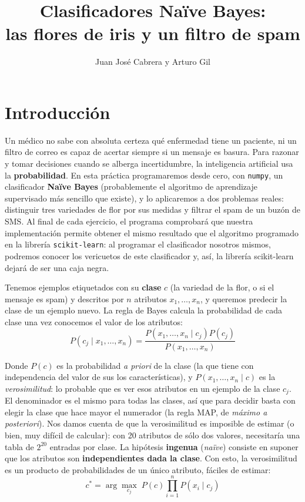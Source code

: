 \documentclass{article}
\title{Clasificadores Naïve Bayes:\\ las flores de iris y un filtro de spam}
\author{Juan José Cabrera y Arturo Gil}
\begin{document}
\maketitle

\section*{Introducción}
Un médico no sabe con absoluta certeza qué enfermedad tiene un paciente, ni un filtro de correo es capaz de acertar siempre si un mensaje es basura. Para razonar y tomar decisiones cuando se alberga incertidumbre, la inteligencia artificial usa la \textbf{probabilidad}. En esta práctica programaremos desde cero, con \texttt{numpy}, un clasificador \textbf{Naïve Bayes} (probablemente el algoritmo de aprendizaje supervisado más sencillo que existe), y lo aplicaremos a dos problemas reales: distinguir tres variedades de flor por sus medidas y filtrar el spam de un buzón de SMS. Al final de cada ejercicio, el programa comprobará que nuestra implementación permite obtener el mismo resultado que el algoritmo programado en la librería \texttt{scikit-learn}: al programar el clasificador  nosotros mismos, podremos conocer los vericuetos de este clasificador y, así, la librería scikit-learn dejará de ser una caja negra.

Tenemos ejemplos etiquetados con su \textbf{clase} $c$ (la variedad de la flor, o si el mensaje es spam) y descritos por $n$ atributos $x_1, \ldots, x_n$, y queremos predecir la clase de un ejemplo nuevo. La regla de Bayes calcula la probabilidad de cada clase una vez conocemos el valor de los atributos:
\begin{equation}
P(c_j \mid x_1, \ldots, x_n) = \frac{P(x_1, \ldots, x_n \mid c_j)P(c_j)}{P(x_1, \ldots, x_n)}
\end{equation}

\noindent Donde $P(c)$ es la probabilidad \textit{a priori} de la clase (la que tiene con independencia del valor de sus los características), y $P(x_1, \ldots, x_n \mid c)$ es la \textit{verosimilitud}: lo probable que es ver esos atributos en un ejemplo de la clase $c_j$. El denominador es el mismo para todas las clases, así que para decidir basta con elegir la clase que hace mayor el numerador (la regla MAP, de \textit{máximo a posteriori}). Nos damos cuenta de que la verosimilitud es imposible de estimar (o bien, muy difícil de calcular): con 20 atributos de sólo dos valores, necesitaría una tabla de $2^{20}$ entradas por clase. La hipótesis \textbf{ingenua} (\textit{naïve}) consiste en suponer que los atributos son \textbf{independientes dada la clase}. Con esto, la verosimilitud es un producto de probabilidades de un único atributo, fáciles de estimar:
\begin{equation}\label{eq:prod_independientes}
c^{*} = \arg\max_{c_j} \; P(c) \prod_{i=1}^{n} P(x_i \mid c_j)
\end{equation}
\end{document}
